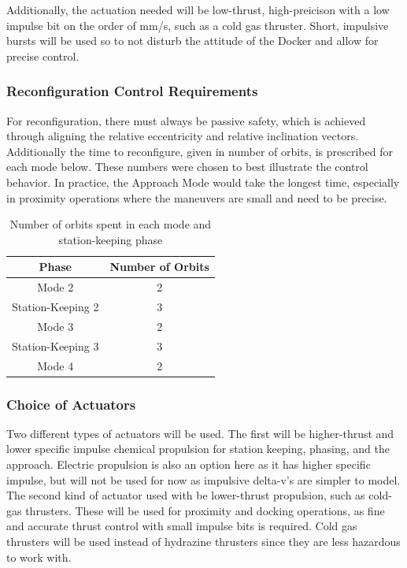Additionally, the actuation needed will be low-thrust, high-preicison with a low impulse bit on the order of mm/s, such as a cold gas thruster. Short, impulsive bursts will be used so to not disturb the attitude of the Docker and allow for precise control. 


\subsubsection{Reconfiguration Control Requirements}
For reconfiguration, there must always be passive safety, which is achieved through aligning the relative eccentricity and relative inclination vectors. Additionally the time to reconfigure, given in number of orbits, is prescribed for each mode below. These numbers were chosen to best illustrate the control behavior. In practice, the Approach Mode would take the longest time, especially in proximity operations where the maneuvers are small and need to be precise. 

\begin{table}[h!]
\centering
\begin{tabular}{|c|c|}
\hline
\textbf{Phase} & \textbf{Number of Orbits} \\
\hline
Mode 2 & 2 \\
Station-Keeping 2 & 3 \\
Mode 3 & 2 \\
Station-Keeping 3 & 3 \\
Mode 4 & 2 \\
\hline
\end{tabular}
\caption{Number of orbits spent in each mode and station-keeping phase} \label{tab:mode_durations}
\end{table}

\subsubsection{Choice of Actuators}
Two different types of actuators will be used. The first will be higher-thrust and lower specific impulse chemical propulsion for station keeping, phasing, and the approach. Electric propulsion is also an option here as it has higher specific impulse, but will not be used for now as impulsive delta-v's are simpler to model. The second kind of actuator used with be lower-thrust propulsion, such as cold-gas thrusters. These will be used for proximity and docking operations, as fine and accurate thrust control with small impulse bits is required. Cold gas thrusters will be used instead of hydrazine thrusters since they are less hazardous to work with. 

